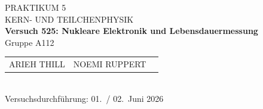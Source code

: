 \documentclass[%
paper=a4,       %
fontsize=11pt,  %
ngerman         %
]{scrreprt}
\begin{document}
\begin{titlepage}
  \centering
  \vspace*{2cm}
  
  {\Large PRAKTIKUM 5}\\[0.5cm]
  {\large KERN- UND TEILCHENPHYSIK }\\[1cm]
  
  {\LARGE\bfseries Versuch 525: Nukleare Elektronik und Lebensdauermessung}\\[1cm]
  
  Gruppe A112\\[1cm]
  
  \begin{tabular}{lll}
    ARIEH THILL & NOEMI RUPPERT  \\
  \end{tabular}\\[2cm]
  
  Versuchsdurchführung: 01.~/ 02.~Juni 2026
  
  \vfill
\end{titlepage}

\tableofcontents
\clearpage
\clearpage
\setcounter{page}{1}
 
 
 
 
 
 
 



\appendix
\printbibliography{}
%
\end{document}
